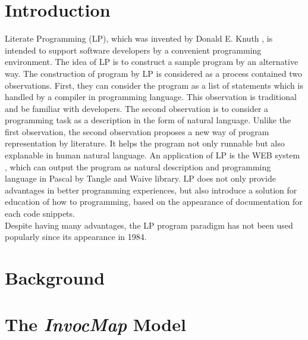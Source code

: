 \documentclass[sigconf,review,anonymous]{article}
\begin{document}
\section{Introduction}
Literate Programming (LP), which was invented by Donald E. Knuth \cite{001}, is intended to support software developers by a convenient programming environment. The idea of LP is to construct a sample program by an alternative way. The construction of program by LP is considered as a process contained two observations. First, they can consider the program as a list of statements which is handled by a compiler in programming language. This observation is traditional and be familiar with developers. The second observation is to consider a programming task as a description in the form of natural language. Unlike the first observation, the second observation proposes a new way of program representation by literature. It helps the program not only runnable but also explanable in human natural language. An application of LP is the WEB system \cite{001}, which can output the program as natural description and programming language in Pascal by Tangle and Waive library. LP does not only provide advantages in better programming experiences, but also introduce a solution for education of how to programming, based on the appearance of documentation for each code snippets.
\\
Despite having many advantages, the LP program paradigm has not been used popularly since its appearance in 1984. 
\section{Background}
\section{The \textit{InvocMap} Model}
\end{document}
